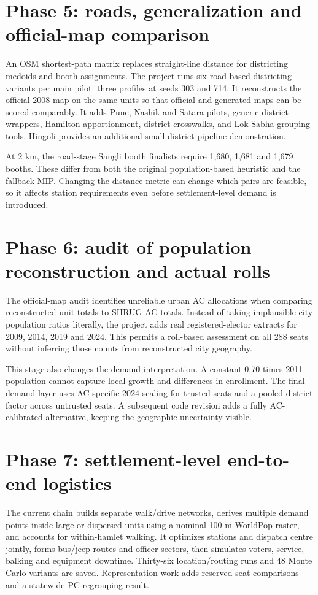 \documentclass[11pt,a4paper,oneside]{report}
\newcommand{\source}[1]{\par\nopagebreak[4]{\footnotesize\color{teal}Evidence: #1.}\par}
\begin{document}
\section{Phase 5: roads, generalization and official-map comparison}
An OSM shortest-path matrix replaces straight-line distance for districting medoids and booth assignments. The project runs six road-based districting variants per main pilot: three profiles at seeds 303 and 714. It reconstructs the official 2008 map on the same units so that official and generated maps can be scored comparably. It adds Pune, Nashik and Satara pilots, generic district wrappers, Hamilton apportionment, district crosswalks, and Lok Sabha grouping tools. Hingoli provides an additional small-district pipeline demonstration.

At 2 km, the road-stage Sangli booth finalists require 1,680, 1,681 and 1,679 booths. These differ from both the original population-based heuristic and the fallback MIP. Changing the distance metric can change which pairs are feasible, so it affects station requirements even before settlement-level demand is introduced.
\source{[S3]--[S5], [S14], [S15]}

\section{Phase 6: audit of population reconstruction and actual rolls}
The official-map audit identifies unreliable urban AC allocations when comparing reconstructed unit totals to SHRUG AC totals. Instead of taking implausible city population ratios literally, the project adds real registered-elector extracts for 2009, 2014, 2019 and 2024. This permits a roll-based assessment on all 288 seats without inferring those counts from reconstructed city geography.

This stage also changes the demand interpretation. A constant 0.70 times 2011 population cannot capture local growth and differences in enrollment. The final demand layer uses AC-specific 2024 scaling for trusted seats and a pooled district factor across untrusted seats. A subsequent code revision adds a fully AC-calibrated alternative, keeping the geographic uncertainty visible.
\source{[S5]--[S7]}

\section{Phase 7: settlement-level end-to-end logistics}
The current chain builds separate walk/drive networks, derives multiple demand points inside large or dispersed units using a nominal 100 m WorldPop raster, and accounts for within-hamlet walking. It optimizes stations and dispatch centre jointly, forms bus/jeep routes and officer sectors, then simulates voters, service, balking and equipment downtime. Thirty-six location/routing runs and 48 Monte Carlo variants are saved. Representation work adds reserved-seat comparisons and a statewide PC regrouping result.
\end{document}
